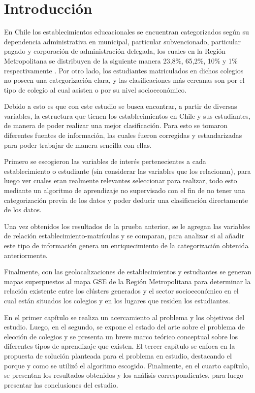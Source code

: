 \chapter*{Introducci\'on}

En Chile los establecimientos educacionales se encuentran categorizados según su dependencia administrativa en municipal, particular subvencionado, particular pagado y corporación de administración delegada, los cuales en la Región Metropolitana se distribuyen de la siguiente manera 23,8\%, 65,2\%, 10\% y 1\% respectivamente \cite{estadisticasEducacion}. Por otro lado, los estudiantes matriculados en dichos colegios no poseen una categorización clara, y las clasificaciones más cercanas son por el tipo de colegio al cual asisten o por su nivel socioeconómico.

Debido a esto es que con este estudio se busca encontrar, a partir de diversas variables, la estructura que tienen los establecimientos en Chile y sus estudiantes, de manera de poder realizar una mejor clasificación. Para esto se tomaron diferentes fuentes de información, las cuales fueron corregidas y estandarizadas para poder trabajar de manera sencilla con ellas.

Primero se escogieron las variables de interés pertenecientes a cada establecimiento o estudiante (sin considerar las variables que los relacionan), para luego ver cuales eran realmente relevantes seleccionar para realizar, todo esto mediante un algoritmo de aprendizaje no supervisado con el fin de no tener una categorización previa de los datos y poder deducir una clasificación directamente de los datos.

Una vez obtenidos los resultados de la prueba anterior, se le agregan las variables de relación establecimiento-matrículas y se comparan, para analizar si al añadir este tipo de información genera un enriquecimiento de la categorización obtenida anteriormente.

Finalmente, con las geolocalizaciones de establecimientos y estudiantes se generan mapas superpuestos al mapa GSE de la Región Metropolitana para determinar la relación existente entre los clústers generados y el sector socioeconómico en el cual están situados los colegios y en los lugares que residen los estudiantes.

En el primer capítulo se realiza un acercamiento al problema y los objetivos del estudio. Luego, en el segundo, se expone el estado del arte sobre el problema de elección de colegios y se presenta un breve marco teórico conceptual sobre los diferentes tipos de aprendizaje que existen. El tercer capítulo se enfoca en la propuesta de solución planteada para el problema en estudio, destacando el porque y como se utilizó el algoritmo escogido. Finalmente, en el cuarto capítulo, se presentan los resultados obtenidos y los análisis correspondientes, para luego presentar las conclusiones del estudio.